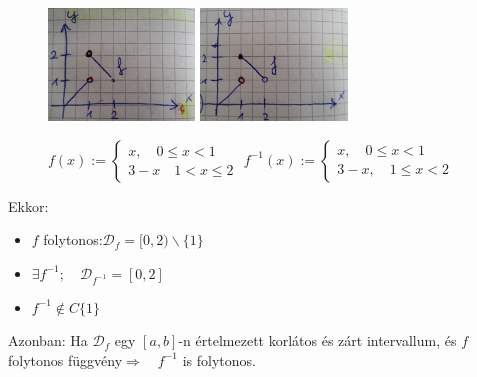 \documentclass[a4paper,11.5pt]{article}
\begin{document}
	\begin{example}\
		
		\begin{figure}[H]
			\centering
			\includegraphics[height=3cm]{kepek/inverse_function_example_1.jpg}\quad \quad \quad 
			\includegraphics[height=3cm]{kepek/inverse_function_example_2.jpg}
			
			\medskip
			$f(x):=\left\{\begin{gathered}
			x,\quad 0\leq x<1\\
			3-x\quad 1<x\leq 2
			\end{gathered}\right.$
			\quad \quad \quad $f^{-1}(x):=\left\{\begin{gathered}
			x,\quad 0\leq x<1\\
			3-x,\quad 1\leq x<2
			\end{gathered}\right. $
			\caption{}\label{fig_folytonossag_nem_oroklodik}
		\end{figure}
		
		Ekkor:
		\begin{itemize}[$\bullet$]
			\item $f$ folytonos:\quad $\mathcal{D}_f=[0,2)\backslash\{1\}$
			\item $\exists f^{-1};\quad \mathcal{D}_{f^{-1}}=[0,2]$
			\item $f^{-1}\notin C\{1\}$
		\end{itemize}
		Azonban: \quad Ha $\mathcal{D}_f$ egy $[a,b]$-n értelmezett korlátos és zárt intervallum, és $f$ folytonos függvény\quad $\Rightarrow\quad f^{-1}$ is folytonos.
	\end{example}
\end{document}
